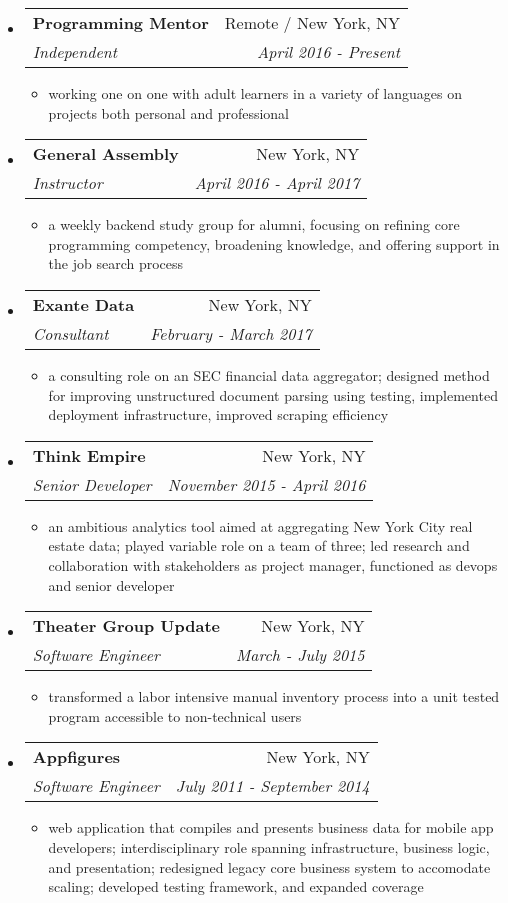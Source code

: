\documentclass[letterpaper,11pt]{article}
\makeatletter
\newcommand{\resitem}[1]{\item #1 \vspace{-2pt}}
\newcommand{\resheading}[1]{{\large \parashade[.9]{sharpcorners}{\textbf{#1 \vphantom{p\^{E}}}}}}
\newcommand{\ressubheading}[4]{
\begin{tabular*}{6.5in}{l@{\extracolsep{\fill}}r}
		\textbf{#1} & #2 \\
		\textit{#3} & \textit{#4} \\
\end{tabular*}\vspace{-6pt}}
\makeatother
\begin{document}
\resheading{Professional}
\begin{itemize}

\item
	\ressubheading{Programming Mentor}{Remote / New York, NY}{Independent}{April 2016 - Present}
	\begin{itemize}
		\resitem{working one on one with adult learners in a variety of languages on projects both personal and professional}
	\end{itemize}

\item
	\ressubheading{General Assembly}{New York, NY}{Instructor}{April 2016 - April 2017}
	\begin{itemize}
		\resitem{a weekly backend study group for alumni, focusing on refining core programming competency, broadening knowledge, and offering support in the job search process}
	\end{itemize}

\item
	\ressubheading{Exante Data}{New York, NY}{Consultant}{February - March 2017}
	\begin{itemize}
		\resitem{a consulting role on an SEC financial data aggregator; designed method for improving unstructured document parsing using testing, implemented deployment infrastructure, improved scraping efficiency}
	\end{itemize}

\item
	\ressubheading{Think Empire}{New York, NY}{Senior Developer}{November 2015 - April 2016}
	\begin{itemize}
		\resitem{an ambitious analytics tool aimed at aggregating New York City real estate data; played variable role on a team of three; led research and collaboration with stakeholders as project manager, functioned as devops and senior developer}
	\end{itemize}

\item
	\ressubheading{Theater Group Update}{New York, NY}{Software Engineer}{March - July 2015}
	\begin{itemize}
		\resitem{transformed a labor intensive manual inventory process into a unit tested program accessible to non-technical users}
	\end{itemize}

\item
	\ressubheading{Appfigures}{New York, NY}{Software Engineer}{July 2011 - September 2014}
	\begin{itemize}
		\resitem{web application that compiles and presents business data for mobile app developers; interdisciplinary role spanning infrastructure, business logic, and presentation; redesigned legacy core business system to accomodate scaling; developed testing framework, and expanded coverage}
	\end{itemize}

\end{itemize}
\end{document}
